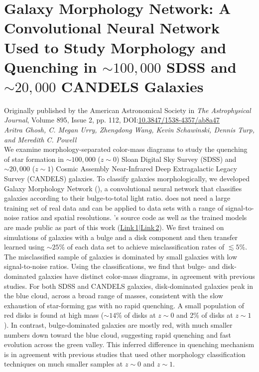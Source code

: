 \chapter{Galaxy Morphology Network: A Convolutional Neural Network Used to Study Morphology and Quenching in $\sim 100,000$ SDSS and $\sim 20,000$ CANDELS Galaxies}

Originally published by the American Astronomical Society in \textit{The Astrophysical Journal}, Volume 895, Issue 2, pp. 112, DOI:\href{https://iopscience.iop.org/article/10.3847/1538-4357/ab8a47/meta}{10.3847/1538-4357/ab8a47}\\
{\large \emph{Aritra Ghosh, C. Megan Urry, Zhengdong Wang, Kevin Schawinski, Dennis Turp, and Meredith C. Powell} }\\


We examine morphology-separated color-mass diagrams to study the quenching of star formation in $\sim 100,000$ ($z\sim0$) Sloan Digital Sky Survey (SDSS) and $\sim 20,000$ ($z\sim1$) Cosmic Assembly Near-Infrared Deep Extragalactic Legacy Survey (CANDELS) galaxies. To classify galaxies morphologically, we developed Galaxy Morphology Network (\gamornet{}), a convolutional neural network that classifies galaxies according to their bulge-to-total light ratio. \gamornet{} does not need a large training set of real data and can be applied to data sets with a range of signal-to-noise ratios and spatial resolutions. \gamornet{}'s source code as well as the trained models are made public as part of this work (\href{http://www.astro.yale.edu/aghosh/gamornet.html}{Link\,1}$\vert$\href{http://gamornet.ghosharitra.com}{Link\,2}). We first trained \gamornet{} on simulations of galaxies with a bulge and a disk component and then transfer learned using $\sim25\%$ of each data set to achieve misclassification rates of $\lesssim5\%$. The misclassified sample of galaxies is dominated by small galaxies with low signal-to-noise ratios. Using the \gamornet{} classifications, we find that bulge- and disk-dominated galaxies have distinct color-mass diagrams, in agreement with previous studies. For both SDSS and CANDELS galaxies, disk-dominated galaxies peak in the blue cloud, across a broad range of masses, consistent with the slow exhaustion of star-forming gas with no rapid quenching. A small population of red disks is found at high mass ($\sim14$\% of disks at $z\sim0$ and 2\% of disks at $z \sim 1$). In contrast, bulge-dominated galaxies are mostly red, with much smaller numbers down toward the blue cloud, suggesting rapid quenching and fast evolution across the green valley. This inferred difference in quenching mechanism is in agreement with previous studies that used other morphology classification techniques on much smaller samples at $z\sim0$ and $z\sim1$.

